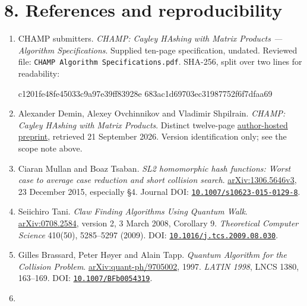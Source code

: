 \documentclass[
  english,
  11pt,
  a4paper,
]{article}
\newenvironment{Shaded}{}{}
\newcommand{\NormalTok}[1]{#1}
\begin{document}

\section{8. References and
reproducibility}\label{references-and-reproducibility}

\begin{enumerate}
\def\labelenumi{\arabic{enumi}.}
\item
  CHAMP submitters. \emph{CHAMP: Cayley HAshing with Matrix Products ---
  Algorithm Specifications}. Supplied ten-page specification, undated.
  Reviewed file: \texttt{CHAMP\ Algorithm\ Specifications.pdf}. SHA-256,
  split over two lines for readability:

\begin{Shaded}
\begin{Highlighting}[]
\NormalTok{c1201fe48fe45033c9a97e39ff83928e}
\NormalTok{683ac1d69703ec31987752f6f7dfaa69}
\end{Highlighting}
\end{Shaded}
\item
  Alexander Demin, Alexey Ovchinnikov and Vladimir Shpilrain.
  \emph{CHAMP: Cayley HAshing with Matrix Products}. Distinct
  twelve-page
  \href{https://shpilrain.ccny.cuny.edu/Cayley\%20hash\%20paper.pdf}{author-hosted
  preprint}, retrieved 21 September 2026. Version identification only;
  see the scope note above.
\item
  Ciaran Mullan and Boaz Tsaban. \emph{SL2 homomorphic hash functions:
  Worst case to average case reduction and short collision search}.
  \href{https://arxiv.org/abs/1306.5646v3}{arXiv:1306.5646v3}, 23
  December 2015, especially §4. Journal DOI:
  \href{https://doi.org/10.1007/s10623-015-0129-8}{\nolinkurl{10.1007/s10623-015-0129-8}}.
\item
  Seiichiro Tani. \emph{Claw Finding Algorithms Using Quantum Walk}.
  \href{https://arxiv.org/abs/0708.2584v2}{arXiv:0708.2584}, version 2,
  3 March 2008, Corollary 9. \emph{Theoretical Computer Science}
  410(50), 5285--5297 (2009). DOI:
  \href{https://doi.org/10.1016/j.tcs.2009.08.030}{\nolinkurl{10.1016/j.tcs.2009.08.030}}.
\item
  Gilles Brassard, Peter Høyer and Alain Tapp. \emph{Quantum Algorithm
  for the Collision Problem}.
  \href{https://arxiv.org/abs/quant-ph/9705002}{arXiv:quant-ph/9705002},
  1997. \emph{LATIN 1998}, LNCS 1380, 163--169. DOI:
  \href{https://doi.org/10.1007/BFb0054319}{\nolinkurl{10.1007/BFb0054319}}.
\item

\end{enumerate}
\end{document}
